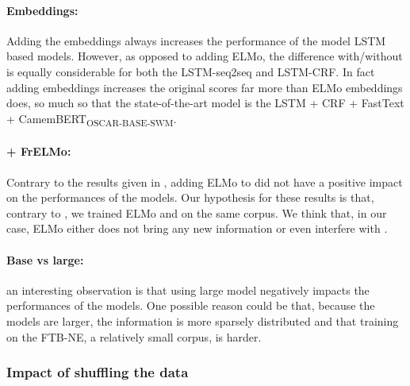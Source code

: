 \paragraph{\camembert Embeddings:} Adding the \camembert embeddings always increases the performance of the model LSTM based models. However, as opposed to adding ELMo, the difference with/without \camembert is equally considerable for both the LSTM-seq2seq and LSTM-CRF. In fact adding \camembert embeddings increases the original scores far more than ELMo embeddings does, so much so that the state-of-the-art model is the LSTM + CRF + FastText + CamemBERT\textsubscript{OSCAR-BASE-SWM}.

\paragraph{\camembert + FrELMo:} Contrary to the results given in , adding ELMo to \camembert did not have a positive impact on the performances of the models. Our hypothesis for these results is that, contrary to , we trained ELMo and \camembert on the same corpus. We think that, in our case, ELMo either does not bring any new information or even interfere with \camembert.

\paragraph{Base vs large:} an interesting observation is that using large model negatively impacts the performances of the models. One possible reason could be that, because the models are larger, the information is more sparsely distributed and that training on the FTB-NE, a relatively small corpus, is harder.



\subsubsection{Impact of shuffling the data}
\label{subsubsec:shuffling}

